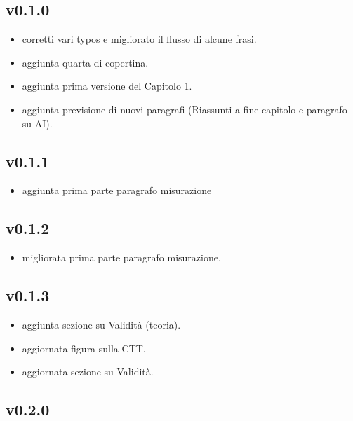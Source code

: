 \documentclass[
  italian,
  letterpaper,
  paper=6in:9in,
  pagesize=pdftex,
  headinclude=on,
  footinclude=on,
  11pt]{scrbook}
\providecommand{\tightlist}{%
  \setlength{\itemsep}{0pt}\setlength{\parskip}{0pt}}
\begin{document}
\subsection*{v0.1.0}\label{v0.1.0}

\begin{itemize}
\tightlist
\item
  corretti vari typos e migliorato il flusso di alcune frasi.
\item
  aggiunta quarta di copertina.
\item
  aggiunta prima versione del Capitolo 1.
\item
  aggiunta previsione di nuovi paragrafi (Riassunti a fine capitolo e
  paragrafo su AI).
\end{itemize}

\subsection*{v0.1.1}\label{v0.1.1}

\begin{itemize}
\tightlist
\item
  aggiunta prima parte paragrafo misurazione
\end{itemize}

\subsection*{v0.1.2}\label{v0.1.2}

\begin{itemize}
\tightlist
\item
  migliorata prima parte paragrafo misurazione.
\end{itemize}

\subsection*{v0.1.3}\label{v0.1.3}

\begin{itemize}
\tightlist
\item
  aggiunta sezione su Validità (teoria).
\item
  aggiornata figura sulla CTT.
\item
  aggiornata sezione su Validità.
\end{itemize}

\subsection*{v0.2.0}\label{v0.2.0}
\end{document}
